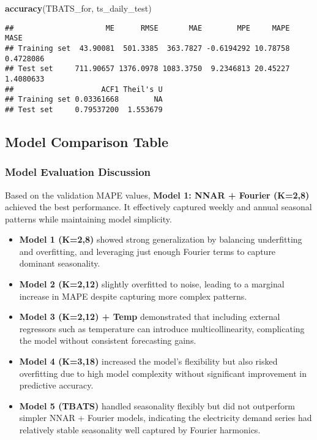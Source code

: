 \documentclass[
]{article}
\newenvironment{Shaded}{\begin{snugshade}}{\end{snugshade}}
\newcommand{\FunctionTok}[1]{\textcolor[rgb]{0.13,0.29,0.53}{\textbf{#1}}}
\newcommand{\NormalTok}[1]{#1}
\providecommand{\tightlist}{%
  \setlength{\itemsep}{0pt}\setlength{\parskip}{0pt}}
\begin{document}
\begin{Shaded}
\begin{Highlighting}[]
\FunctionTok{accuracy}\NormalTok{(TBATS\_for, ts\_daily\_test)}
\end{Highlighting}
\end{Shaded}

\begin{verbatim}
##                     ME      RMSE       MAE        MPE     MAPE      MASE
## Training set  43.90081  501.3385  363.7827 -0.6194292 10.78758 0.4728086
## Test set     711.90657 1376.0978 1083.3750  9.2346813 20.45227 1.4080633
##                    ACF1 Theil's U
## Training set 0.03361668        NA
## Test set     0.79537200  1.553679
\end{verbatim}

\subsection{Model Comparison Table}\label{model-comparison-table}

\subsubsection{Model Evaluation
Discussion}\label{model-evaluation-discussion}

Based on the validation MAPE values, \textbf{Model 1: NNAR + Fourier
(K=2,8)} achieved the best performance. It effectively captured weekly
and annual seasonal patterns while maintaining model simplicity.

\begin{itemize}
\tightlist
\item
  \textbf{Model 1 (K=2,8)} showed strong generalization by balancing
  underfitting and overfitting, and leveraging just enough Fourier terms
  to capture dominant seasonality.
\item
  \textbf{Model 2 (K=2,12)} slightly overfitted to noise, leading to a
  marginal increase in MAPE despite capturing more complex patterns.
\item
  \textbf{Model 3 (K=2,12) + Temp} demonstrated that including external
  regressors such as temperature can introduce multicollinearity,
  complicating the model without consistent forecasting gains.
\item
  \textbf{Model 4 (K=3,18)} increased the model's flexibility but also
  risked overfitting due to high model complexity without significant
  improvement in predictive accuracy.
\item
  \textbf{Model 5 (TBATS)} handled seasonality flexibly but did not
  outperform simpler NNAR + Fourier models, indicating the electricity
  demand series had relatively stable seasonality well captured by
  Fourier harmonics.
\end{itemize}
\end{document}
